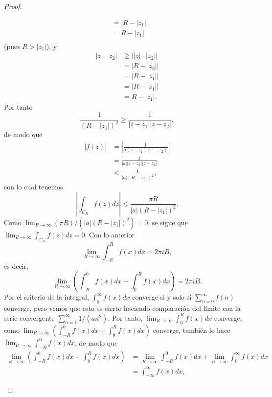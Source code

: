 \begin{proof}
\begin{itemize}
$$\begin{aligned}
                   &=|R-|z_1||\\
                   &=R-|z_1|\\
         \end{aligned}
         $$
         (pues $R>|z_1|$), y
         $$
         \begin{aligned}
            |z-z_2|&\geq||z|-|z_2||\\
                   &=|R-|z_2||\\
                   &=|R-|\overline{z_1}||\\
                   &=|R-|z_1||\\
                   &=R-|z_1|.
         \end{aligned}
         $$
         Por tanto
         $$
         \frac{1}{(R-|z_1|)^2}\geq\frac{1}{|z-z_1||z-z_2|},
         $$
         de modo que
         $$
         \begin{aligned}
            |f(z)|&=\left|\frac{1}{a(z-z_1)(z-z_2)}\right|\\
                  &=\frac{1}{|a||z-z_1||z-z_2|}\\
                  &\leq\frac{1}{|a|(R-|z_1|)^2},
         \end{aligned}
         $$
         con lo cual tenemos
         $$
         \left|\int_{C_R}f(z)dz\right|\leq \frac{\pi R}{|a|(R-|z_1|)^2}.
         $$
         Como $\lim_{R\to\infty}(\pi R)/(|a|(R-|z_1|)^2)=0$, se sigue que $\lim_{R\to\infty} \int_{C_R}f(z)dz=0$. Con lo anterior
         $$
         \lim_{R\to\infty}\int_{-R}^{R}f(x)dx=2\pi i B,
         $$
         es decir, 
         $$
         \lim_{R\to\infty}\left( \int_{-R}^{0}f(x)dx+\int_{0}^{R}f(x)dx\right)=2 \pi i B.
         $$
         Por el criterio de la integral, $\int_{0}^{\infty}f(x)dx$ converge si y solo si $\sum_{n=0}^{\infty}f(n)$ converge, pero vemos que esto es cierto haciendo comparación del límite con la serie convergente $\sum_{n=1}^{\infty}1/(an^2)$. Por tanto, $\lim_{R\to\infty}\int_{0}^{R}f(x)dx$ converge; como $\lim_{R\to\infty}\left( \int_{-R}^{0}f(x)dx+\int_{0}^{R}f(x)dx\right)$ converge, también lo hace $\lim_{R\to\infty}\int_{-R}^{0}f(x)dx$, de modo que
         $$
         \begin{aligned}
            \lim_{R\to\infty}\left( \int_{-R}^{0}f(x)dx+\int_{0}^{R}f(x)dx\right)&=\lim_{R\to\infty}\int_{-R}^{0}f(x)dx+\lim_{R\to\infty}\int_{0}^{\infty}f(x)dx\\
                                                                                               &=\int_{-\infty}^{\infty} f(x)dx,

\end{aligned}$$
\end{itemize}
\end{proof}
